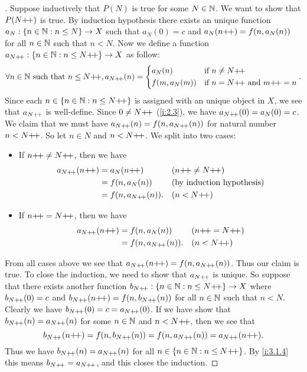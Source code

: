\begin{proof}[]
  Suppose inductively that \(P(N)\) is true for some \(N \in \mathbb{N}\).
  We want to show that \(P(N{+}\!{+})\) is true.
  By induction hypothesis there exists an unique function \(a_N : \left\lbrace n \in \mathbb{N} : n \leq N\right\rbrace \to X\) such that \(a_N(0) = c\) and \(a_N(n{+}\!{+}) = f(n, a_N(n))\) for all \(n \in \mathbb{N}\) such that \(n < N\).
  Now we define a function \(a_{N{+}\!{+}} : \left\lbrace n \in \mathbb{N} : n \leq N{+}\!{+}\right\rbrace \to X\) as follow:
  \[
    \forall n \in \mathbb{N} \text{ such that } n \leq N{+}\!{+}, a_{N{+}\!{+}}(n) = \begin{dcases}
      a_N(n)       & \text{if } n \neq N{+}\!{+}                    \\
      f(m, a_N(m)) & \text{if } n = N{+}\!{+} \text{ and } m{+}\!{+} = n
    \end{dcases}.
  \]
  Since each \(n \in \left\lbrace n \in \mathbb{N} : n \leq N{+}\!{+}\right\rbrace\) is assigned with an unique object in \(X\), we see that \(a_{N{+}\!{+}}\) is well-define.
  Since \(0 \neq N{+}\!{+}\) (\cref{i:2.3}), we have \(a_{N{+}\!{+}}(0) = a_N(0) = c\).
  We claim that we must have \(a_{N{+}\!{+}}(n) = f(n, a_{N{+}\!{+}}(n))\) for natural number \(n < N{+}\!{+}\).
  So let \(n \in N\) and \(n < N{+}\!{+}\).
  We split into two cases:
  \begin{itemize}
    \item If \(n{+}\!{+} \neq N{+}\!{+}\), then we have
          \begin{align*}
            a_{N{+}\!{+}}(n{+}\!{+}) & = a_N(n{+}\!{+})          &  & (n{+}\!{+} \neq N{+}\!{+}) \\
                           & = f(n, a_N(n))       &  & \text{(by induction hypothesis)}            \\
                           & = f(n, a_{N{+}\!{+}}(n)). &  & (n < N{+}\!{+})
          \end{align*}
    \item If \(n{+}\!{+} = N{+}\!{+}\), then we have
          \begin{align*}
            a_{N{+}\!{+}}(n{+}\!{+}) & = f(n, a_N(n))       &  & (n{+}\!{+} = N{+}\!{+}) \\
                           & = f(n, a_{N{+}\!{+}}(n)). &  & (n < N{+}\!{+})
          \end{align*}
  \end{itemize}
  From all cases above we see that \(a_{N{+}\!{+}}(n{+}\!{+}) = f(n, a_{N{+}\!{+}}(n))\).
  Thus our claim is true.
  To close the induction, we need to show that \(a_{N{+}\!{+}}\) is unique.
  So suppose that there exists another function \(b_{N{+}\!{+}} : \left\lbrace n \in \mathbb{N} : n \leq N{+}\!{+}\right\rbrace \to X\) where \(b_{N{+}\!{+}}(0) = c\) and \(b_{N{+}\!{+}}(n{+}\!{+}) = f(n, b_{N{+}\!{+}}(n))\) for all \(n \in \mathbb{N}\) such that \(n < N\).
  Clearly we have \(b_{N{+}\!{+}}(0) = c = a_{N{+}\!{+}}(0)\).
  If we have show that \(b_{N{+}\!{+}}(n) = a_{N{+}\!{+}}(n)\) for some \(n \in \mathbb{N}\) and \(n < N{+}\!{+}\), then we see that
  \[
    b_{N{+}\!{+}}(n{+}\!{+}) = f(n, b_{N{+}\!{+}}(n)) = f(n, a_{N{+}\!{+}}(n)) = a_{N{+}\!{+}}(n{+}\!{+}).
  \]
  Thus we have \(b_{N{+}\!{+}}(n) = a_{N{+}\!{+}}(n)\) for all \(n \in \left\lbrace n \in \mathbb{N} : n \leq N{+}\!{+}\right\rbrace\).
  By \cref{i:3.1.4} this means \(b_{N{+}\!{+}} = a_{N{+}\!{+}}\), and this closes the induction.


\end{proof}
